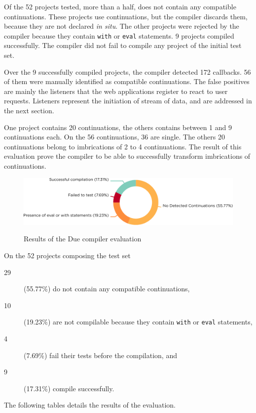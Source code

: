 
Of the \num{52} projects tested, more than a half, does not contain any compatible continuations.
These projects use continuations, but the compiler discards them, because they are not declared \textit{in situ}.
The other projects were rejected by the compiler because they contain \texttt{with} or \texttt{eval} statements. %
\num{9} projects compiled successfully.
The compiler did not fail to compile any project of the initial test set.

Over the \num{9} successfully compiled projects, the compiler detected \num{172} callbacks.
56 of them were manually identified as compatible continuations.
The false positives are mainly the listeners that the web applications register to react to user requests.
Listeners represent the initiation of stream of data, and are addressed in the next section.

One project contains \num{20} continuations, the others contains between \num{1} and \num{9} continuations each.
On the \num{56} continuations, \num{36} are single. %
The others \num{20} continuations belong to imbrications of 2 to 4 continuations.
The result of this evaluation prove the compiler to be able to successfully transform imbrications of continuations.

\begin{figure}[h!]
  \centering
  \includegraphics[width=\linewidth]{../resources/due-evaluation.pdf}
  \label{fig:due-evaluation}
  \caption{Results of the Due compiler evaluation}
\end{figure}

On the \num{52} projects composing the test set
\begin{description}
\item[29] (55.77\%) do not contain any compatible continuations,
\item[10] (19.23\%) are not compilable because they contain \texttt{with} or \texttt{eval} statements,
\item[4] (7.69\%) fail their tests before the compilation, and
\item[9] (17.31\%) compile successfully.
\end{description}
The following tables details the results of the evaluation.

